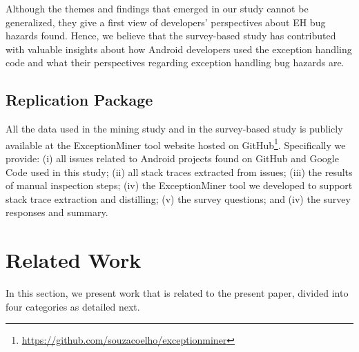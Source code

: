 Although the themes and findings that emerged in our study cannot 
be generalized, they give a first view of developers' perspectives about
 EH bug hazards found. Hence, we believe that the survey-based study 
has contributed with valuable insights about how Android developers 
used the exception handling code and what their perspectives regarding
exception handling bug hazards are.

\subsection{Replication Package}
All the data used in the mining study and in the survey-based study is publicly 
available at the ExceptionMiner tool website hosted on GitHub\footnote{\url{https://github.com/souzacoelho/exceptionminer}}.
Specifically we provide: (i) all issues related to Android projects found
on GitHub and Google Code used in this study; (ii) all stack traces extracted
from issues; (iii) the results of manual inspection steps; (iv) the
ExceptionMiner tool we developed to support stack trace extraction and distilling; 
(v) the survey questions; and (iv) the survey responses and summary.


\section{Related Work}
\label{sec:rele}

In this section, we present work that is related to the present paper, divided into
four categories as detailed next.

